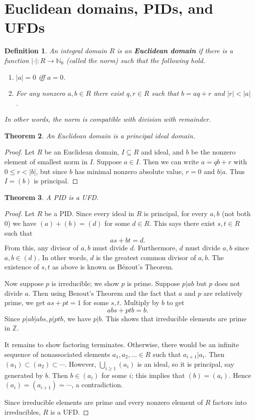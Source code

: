 \documentclass{article}
\theoremstyle{norm}
\newtheorem{theorem}{Theorem}[section]
\newtheorem{definition}[theorem]{Definition}
\begin{document}
\section{Euclidean domains, PIDs, and UFDs}
\begin{definition}
An integral domain $R$ is an \textbf{Euclidean domain} if there is a function $|\cdot |:R\to \mathbb N_0$ (called the norm) such that the following hold.
\begin{enumerate}
\item $|a|=0$ iff $a=0$.
\item For any nonzero $a,b\in R$ there exist $q,r\in R$ such that $b=aq+r$ and $|r|<|a|$.
\end{enumerate}
In other words, the norm is compatible with division with remainder.
\end{definition}
\begin{theorem}
An Euclidean domain is a principal ideal domain.
\end{theorem}
\begin{proof}
Let $R$ be an Euclidean domain, $I\subseteq R$ and ideal, and $b$ be the nonzero element of smallest norm in $I$.
Suppose $ a\in I$. Then we can write $ a = qb + r$ with $ 0\leq r < |b|$, but since $ b$ has minimal nonzero absolute value, $ r = 0$ and $ b|a$. Thus $ I=(b)$ is principal.
\end{proof}

\begin{theorem}
A PID is a UFD.
\end{theorem}
\begin{proof}
Let $R$ be a PID. Since every ideal in $R$ is principal, for every $a,b$ (not both 0) we have $(a)+(b)=(d)$
for some $d\in R$. This says there exist $ s,t\in R$ such that
\[as + bt = d.\]
From this, any divisor of $a,b$ must divide $ d$. Furthermore, $d$ must divide $a,b$ since $a,b\in (d)$. In other words, $d$ is the greatest common divisor of $ a,b$. The existence of $s, t$ as above  is known as B\'ezout's Theorem.

Now suppose $ p$ is irreducible; we show $ p$ is prime. Suppose $ p|ab$ but $ p$ does not divide $ a$. Then using Bezout's Theorem and the fact that $ a$ and $p$ are relatively prime, we get $ as + pt =1$ for some $ s,t$. Multiply by $ b$ to get
\[ abs + ptb = b.\]
Since $ p|ab|abs, p|ptb$, we have $ p|b$. This shows that irreducible elements are prime in $ \mathbb{Z}$.

It remains to show factoring terminates. Otherwise, there would be an infinite sequence of nonassociated elements $a_1,a_2,\ldots \in R$ such that $a_{i+1}|a_i$. Then $(a_1)\subset (a_2)\subset\cdots$. However, $\bigcup_{i\geq 1} (a_i)$ is an ideal, so it is principal, say generated by $b$. Then $b\in (a_i)$ for some $i$; this implies that $(b)=(a_i)$. Hence $(a_i)=(a_{i+1})=\cdots$, a contradiction.

Since irreducible elements are prime and every nonzero element of $R$ factors into irreducibles, $R$ is a UFD.
\end{proof}
\end{document}
